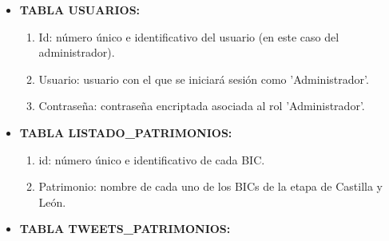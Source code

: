\begin{itemize}
    \item \textbf{TABLA USUARIOS:} 
    \begin{enumerate}
        \item Id: número único e identificativo del usuario (en este caso del administrador).
        \item Usuario: usuario con el que se iniciará sesión como 'Administrador'.
        \item Contraseña: contraseña encriptada asociada al rol 'Administrador'.
    \end{enumerate}
    \item \textbf{TABLA LISTADO\_PATRIMONIOS:}  
    \begin{enumerate}
        \item id: número único e identificativo de cada BIC.
        \item Patrimonio: nombre de cada uno de los BICs de la etapa de Castilla y León.
    \end{enumerate}
    \item \textbf{TABLA TWEETS\_PATRIMONIOS:}  
    \begin{enumerate}


\end{enumerate}
\end{itemize}
